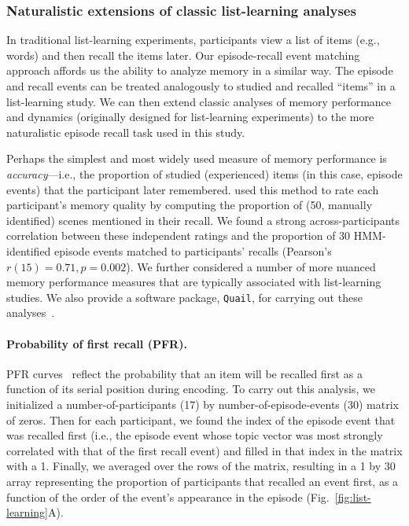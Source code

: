 \documentclass[10pt]{article}
\begin{document}
\subsubsection*{Naturalistic extensions of classic list-learning analyses}
In traditional list-learning experiments, participants view a list of items (e.g., words) and then recall the items later.  Our episode-recall event matching approach affords us the ability to analyze memory in a similar way. The episode and recall events can be treated analogously to studied and recalled ``items'' in a list-learning study.  We can then extend classic analyses of memory performance and dynamics (originally designed for list-learning experiments) to the more naturalistic episode recall task used in this study.

Perhaps the simplest and most widely used measure of memory performance is \textit{accuracy}---i.e., the proportion of studied (experienced) items (in this case, episode events) that the participant later remembered.  \cite{ChenEtal17} used this method to rate each participant's memory quality by computing the proportion of (50, manually identified) scenes mentioned in their recall.  We found a strong across-participants correlation between these independent ratings and the proportion of 30 HMM-identified episode events matched to participants' recalls (Pearson's $r(15) = 0.71, p = 0.002$).  We further considered a number of more nuanced memory performance measures that are typically associated with list-learning studies.  We also provide a software package, \texttt{Quail}, for carrying out these analyses~\citep{HeusEtal17b}.

\paragraph{Probability of first recall (PFR).}  PFR curves~\citep{WelcBurn24, PostPhil65, AtkiShif68} reflect the probability that an item will be recalled first as a function of its serial position during encoding. To carry out this analysis, we initialized a number-of-participants (17) by number-of-episode-events (30) matrix of zeros. Then for each participant, we found the index of the episode event that was recalled first (i.e., the episode event whose topic vector was most strongly correlated with that of the first recall event) and filled in that index in the matrix with a 1.  Finally, we averaged over the rows of the matrix, resulting in a 1 by 30 array representing the proportion of participants that recalled an event first, as a function of the order of the event's appearance in the episode (Fig.~\ref{fig:list-learning}A).
\end{document}
